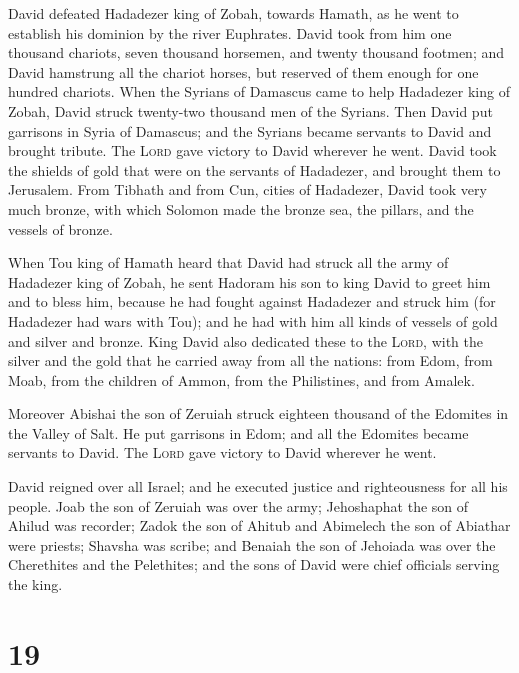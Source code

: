  David defeated Hadadezer king of Zobah, towards Hamath,
as he went to establish his dominion by the river Euphrates.
 David took from him one thousand chariots, seven thousand
horsemen, and twenty thousand footmen; and David hamstrung all the
chariot horses, but reserved of them enough for one hundred chariots.
 When the Syrians of Damascus came to help Hadadezer king
of Zobah, David struck twenty-two thousand men of the Syrians.
 Then David put garrisons in Syria of Damascus; and the
Syrians became servants to David and brought tribute. The \textsc{Lord}
gave victory to David wherever he went.  David took the
shields of gold that were on the servants of Hadadezer, and brought them
to Jerusalem.  From Tibhath and from Cun, cities of
Hadadezer, David took very much bronze, with which Solomon made the
bronze sea, the pillars, and the vessels of bronze.

 When Tou king of Hamath heard that David had struck all
the army of Hadadezer king of Zobah,  he sent Hadoram his
son to king David to greet him and to bless him, because he had fought
against Hadadezer and struck him (for Hadadezer had wars with Tou); and
he had with him all kinds of vessels of gold and silver and bronze.
 King David also dedicated these to the \textsc{Lord},
with the silver and the gold that he carried away from all the nations:
from Edom, from Moab, from the children of Ammon, from the Philistines,
and from Amalek.

 Moreover Abishai the son of Zeruiah struck eighteen
thousand of the Edomites in the Valley of Salt.  He put
garrisons in Edom; and all the Edomites became servants to David. The
\textsc{Lord} gave victory to David wherever he went.

 David reigned over all Israel; and he executed justice
and righteousness for all his people.  Joab the son of
Zeruiah was over the army; Jehoshaphat the son of Ahilud was recorder;
 Zadok the son of Ahitub and Abimelech the son of
Abiathar were priests; Shavsha was scribe;  and Benaiah
the son of Jehoiada was over the Cherethites and the Pelethites; and the
sons of David were chief officials serving the king.

\hypertarget{section-18}{%
\section{19}\label{section-18}}

